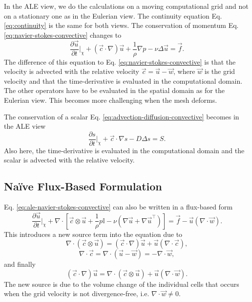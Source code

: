 \documentclass{article}
\newcommand{\pd}[2]{\dfrac{\partial #1}{\partial #2}}
\begin{document}
In the ALE view, we do the calculations on a moving computational grid and not on a stationary one as in the Eulerian view.
The continuity equation Eq. \eqref{eq:continuity} is the same for both views.
The conservation of momentum Eq. \eqref{eq:navier-stokes-convective} changes to \cite{doneaArbitraryAgrangianUlerian2004}
\begin{equation}
    \pd{\vec{u}}{t}\bigg|_\chi +
    \left(\vec{c} \cdot \nabla\right) \vec{u} +
    \frac{1}{\rho} \nabla p -
    \nu \Delta \vec{u} =
    \vec{f}.
    \label{eq:ale-navier-stokes-convective}
\end{equation}
The difference of this equation to Eq. \eqref{eq:navier-stokes-convective} is that the velocity is advected with the relative velocity $\vec{c} = \vec{u} - \vec{w}$, where $\vec{w}$ is the grid velocity and
that the time-derivative is evaluated in the computational domain.
The other operators have to be evaluated in the spatial domain as for the Eulerian view.
This becomes more challenging when the mesh deforms.

The conservation of a scalar Eq. \eqref{eq:advection-diffusion-convective} becomes in the ALE view
\begin{equation}
    \pd{s}{t}\bigg|_\chi + \vec{c} \cdot \nabla s - D \Delta s = S.
    \label{eq:ale-advection-diffusion-convective}
\end{equation}
Also here, the time-derivative is evaluated in the computational domain and the scalar is advected with the relative velocity.

\subsection{Naïve Flux-Based Formulation}
Eq. \eqref{eq:ale-navier-stokes-convective} can also be written in a flux-based form
\begin{equation}
    \pd{\vec{u}}{t}\bigg|_\chi + \nabla \cdot \left[
        \vec{c} \otimes \vec{u} +
        \frac{1}{\rho} p \mathbb{I} -
        \nu \left(\nabla \vec{u} + \nabla \vec{u}^\top\right)
    \right] = \vec{f} - \vec{u} \left(\nabla \cdot \vec{w}\right).
\end{equation}
This introduces a new source term into the equation due to
\begin{equation*}
    \nabla \cdot \left(\vec{c} \otimes \vec{u}\right) =
    \left(\vec{c} \cdot \nabla\right) \vec{u} +
    \vec{u} \left(\nabla \cdot \vec{c}\right),
\end{equation*}
\begin{equation*}
    \nabla \cdot \vec{c} =
    \nabla \cdot \left(\vec{u} - \vec{w}\right) =
    -\nabla \cdot \vec{w},
\end{equation*}
and finally
\begin{equation*}
    \left(\vec{c} \cdot \nabla\right) \vec{u} =
    \nabla \cdot \left(\vec{c} \otimes \vec{u}\right) +
    \vec{u} \left(\nabla \cdot \vec{w}\right).
\end{equation*}
The new source is due to the volume change of the individual cells that occurs when the grid velocity is not divergence-free, i.e. $\nabla \cdot \vec{w} \ne 0$.
\end{document}
